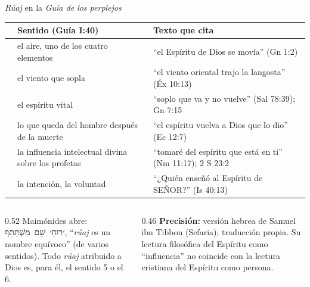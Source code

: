 \documentclass[hyperref={bookmarks=false},aspectratio=169]{beamer}
\newcommand{\heb}[1]{\mbox{\foreignlanguage{hebrew}{#1}}}
\newcommand{\SENOR}{S{\fontsize{0.78em}{1em}\selectfont EÑOR}}
\newcommand{\precision}[1]{{\footnotesize\color{gris}\textbf{Precisión:} #1}}
\begin{document}
\begin{frame}{\emph{Rúaj} en la \emph{Guía de los perplejos}}
\scriptsize\renewcommand{\arraystretch}{1.12}
\begin{tabular}{@{}>{\RaggedRight\arraybackslash}p{0.5cm}>{\RaggedRight\arraybackslash}p{4.4cm}>{\RaggedRight\arraybackslash}p{6.8cm}@{}}
\toprule
& \textbf{Sentido (Guía I:40)} & \textbf{Texto que cita} \\ \midrule
1 & el aire, uno de los cuatro elementos & ``el Espíritu de Dios se movía'' (Gn 1:2) \\
2 & el viento que sopla & ``el viento oriental trajo la langosta'' (Éx 10:13) \\
3 & el espíritu vital & ``soplo que va y no vuelve'' (Sal 78:39); Gn 7:15 \\
4 & lo que queda del hombre después de la muerte & ``el espíritu vuelva a Dios que lo dio'' (Ec 12:7) \\
5 & la influencia intelectual divina sobre los profetas & ``tomaré del espíritu que está en ti'' (Nm 11:17); 2 S 23:2 \\
6 & la intención, la voluntad & ``¿Quién enseñó al Espíritu de \SENOR?'' (Is 40:13) \\
\bottomrule
\end{tabular}\par\medskip
\begin{columns}[t,onlytextwidth]
\begin{column}{0.52\textwidth}\small
Maimónides abre: \heb{׳רוּחַ׳ שֵׁם מִשְׁתַּתֵּף}, ``\emph{rúaj} es un nombre equívoco'' (de varios sentidos). Todo \emph{rúaj} atribuido a Dios es, para él, el sentido 5 o el 6.
\end{column}
\begin{column}{0.46\textwidth}
\precision{versión hebrea de Samuel ibn Tibbon (Sefaria); traducción propia. Su lectura filosófica del Espíritu como ``influencia'' no coincide con la lectura cristiana del Espíritu como persona.}
\end{column}
\end{columns}
\end{frame}
\end{document}
